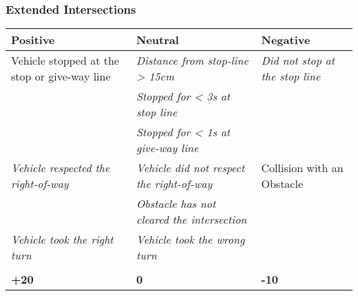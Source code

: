 {	\subsubsection*{Extended Intersections}
	\begin{table}[H]
		\begin{tabularx}{\textwidth}{XXX}
			\toprule
			\textbf{Positive}                                           & \textbf{Neutral}                                                   & \textbf{Negative}                                      \\
			\midrule
			Vehicle stopped at the stop or give-way line                & \textit{Distance from stop-line > 15cm}\footnotemark[1]            & \textit{Did not stop at the stop line}\footnotemark[1] \\
			                                                            & \textit{Stopped for < 3s at stop line}\footnotemark[1]             &                                                        \\
			                                                            & \textit{Stopped for < 1s at give-way line}\footnotemark[3]         &                                                        \\
			\textit{Vehicle respected the right-of-way}\footnotemark[2] & \textit{Vehicle did not respect the right-of-way}\footnotemark[2]  & Collision with an Obstacle                             \\
			                                                            & \textit{Obstacle has not cleared the intersection}\footnotemark[2] &                                                        \\
			\textit{Vehicle took the right turn}\footnotemark[4]        & \textit{Vehicle took the wrong turn}\footnotemark[4]               &                                                        \\
			                                                            &                                                                    &                                                        \\
			\topstrut
			\textbf{+20}                                                & \textbf{0}                                                         & \textbf{-10}                                           \\
			\bottomrule
		\end{tabularx}
	\end{table}

}
